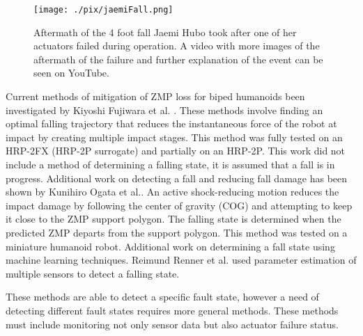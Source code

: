 \begin{figure}[thpb]
  \centering
\texttt{[image: ./pix/jaemiFall.png]}
  \caption{Aftermath of the 4 foot fall Jaemi Hubo took after one of her actuators failed during operation.  A video with more images of the aftermath of the failure and further explanation of the event can be seen on YouTube.}%
  \label{fig:fall}
\end{figure}  
 

Current methods of mitigation of ZMP loss for biped humanoids been investigated by Kiyoshi Fujiwara et al. \cite{4115653}.  These methods involve finding an optimal falling trajectory that reduces the instantaneous force of the robot at impact by creating multiple impact stages\cite{4399327}.  This method was fully tested on an HRP-2FX (HRP-2P surrogate) and partially on an HRP-2P.  This work did not include a method of determining a falling state, it is assumed that a fall is in progress.  Additional work on detecting a fall and reducing fall damage has been shown by Kunihiro Ogata et al.\cite{4755950}.  An active shock-reducing motion reduces the impact damage by following the center of gravity (COG) and attempting to keep it close to the ZMP support polygon.  The falling state is determined when the predicted ZMP departs from the support polygon. This method was tested on a miniature humanoid robot.  Additional work on determining a fall state using machine learning techniques\cite{4813885}.  Reimund Renner et al. used parameter estimation of multiple sensors to detect a falling state\cite{4058847}.

These methods are able to detect a specific fault state, however a need of detecting different fault states requires more general methods.  These methods must include monitoring not only sensor data but also actuator failure status.